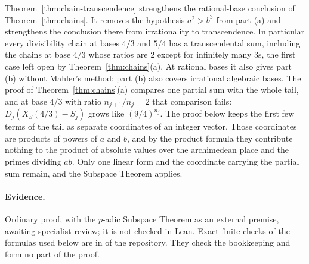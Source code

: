 \documentclass[11pt]{article}
\begin{document}
Theorem~\ref{thm:chain-transcendence} strengthens the rational-base conclusion
of Theorem~\ref{thm:chains}. It removes the hypothesis $a^2>b^3$ from part (a)
and strengthens the conclusion there from irrationality to transcendence. In
particular every divisibility chain at bases $4/3$ and $5/4$ has a
transcendental sum, including the chains at base $4/3$ whose ratios are $2$
except for infinitely many $3$s, the first case left open by
Theorem~\ref{thm:chains}(a). At rational bases it also gives part (b) without
Mahler's method; part (b) also covers irrational algebraic bases. The proof of Theorem~\ref{thm:chains}(a) compares one partial
sum with the whole tail, and at base $4/3$ with ratio $n_{j+1}/n_j=2$ that
comparison fails: $D_j(X_S(4/3)-S_j)$ grows like $(9/4)^{n_j}$. The proof below
keeps the first few terms of the tail as separate coordinates of an integer
vector. Those coordinates are products of powers of $a$ and $b$, and by the
product formula they contribute nothing to the product of absolute values over
the archimedean place and the primes dividing $ab$. Only one linear form and
the coordinate carrying the partial sum remain, and the Subspace Theorem
applies.

\paragraph{Evidence.} Ordinary proof, with the $p$-adic Subspace Theorem as an
external premise, awaiting specialist review; it is not checked in Lean. Exact finite checks of the
formulas used below are in  of
the repository. They check the bookkeeping and form no part of the proof.
\end{document}
